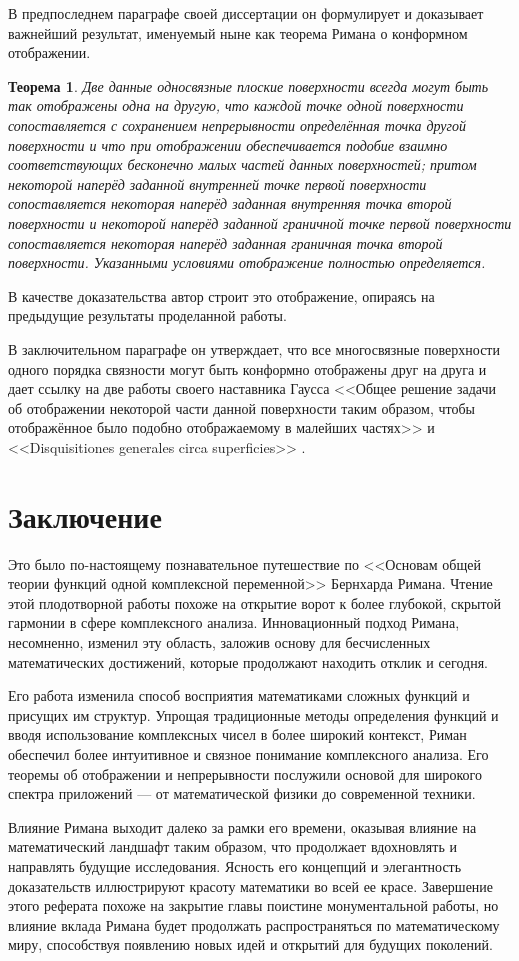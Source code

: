\documentclass[a4paper,12pt]{article}
\newtheorem*{theorem}{Теорема}
\theoremstyle{remark}
\begin{document}
В предпоследнем параграфе своей диссертации он формулирует и доказывает
важнейший результат, именуемый ныне как теорема Римана о конформном отображении.
\begin{theorem}
  Две данные односвязные плоские поверхности всегда могут быть
  так отображены одна на другую, что каждой точке одной поверхности
  сопоставляется с сохранением непрерывности определённая точка другой
  поверхности и что при отображении обеспечивается подобие взаимно
  соответствующих бесконечно малых частей данных поверхностей;
  притом некоторой наперёд заданной внутренней точке первой поверхности
  сопоставляется некоторая наперёд заданная внутренняя точка второй
  поверхности и некоторой наперёд заданной граничной точке
  первой поверхности сопоставляется некоторая наперёд заданная
  граничная точка второй поверхности. Указанными условиями отображение
  полностью определяется.
\end{theorem}
В качестве доказательства автор строит это отображение, опираясь на предыдущие результаты проделанной работы.

В заключительном параграфе он утверждает, что все многосвязные поверхности
одного порядка связности могут быть конформно отображены друг на друга
и дает ссылку на две работы своего наставника Гаусса <<Общее решение задачи об отображении некоторой
части данной поверхности таким образом, чтобы отображённое было
подобно отображаемому в малейших частях>> \cite{GaussMappings} и <<Disquisitiones generales circa superficies>> \cite{Gauss}.

\newpage
\section{Заключение}

Это было по-настоящему познавательное путешествие по
<<Основам общей теории функций одной комплексной переменной>>
Бернхарда Римана.
Чтение этой плодотворной работы похоже на открытие ворот к
более глубокой, скрытой гармонии в сфере комплексного анализа.
Инновационный подход Римана, несомненно, изменил эту область,
заложив основу для бесчисленных математических достижений,
которые продолжают находить отклик и сегодня.

Его работа изменила способ восприятия математиками сложных функций
и присущих им структур. Упрощая традиционные методы определения
функций и вводя использование комплексных чисел в более широкий контекст,
Риман обеспечил более интуитивное и связное понимание комплексного
анализа. Его теоремы об отображении и непрерывности послужили основой для
широкого спектра приложений — от математической физики до современной техники.

Влияние Римана выходит далеко за рамки его времени, оказывая влияние
на математический ландшафт таким образом, что продолжает вдохновлять
и направлять будущие исследования. Ясность его концепций и элегантность доказательств
иллюстрируют красоту математики во всей ее красе. Завершение этого реферата
похоже на закрытие главы поистине монументальной работы, но влияние вклада
Римана будет продолжать распространяться по математическому миру,
способствуя появлению новых идей и открытий для будущих поколений.

\newpage
\printbibliography[title={Литература}, heading=bibnumbered]
\end{document}
